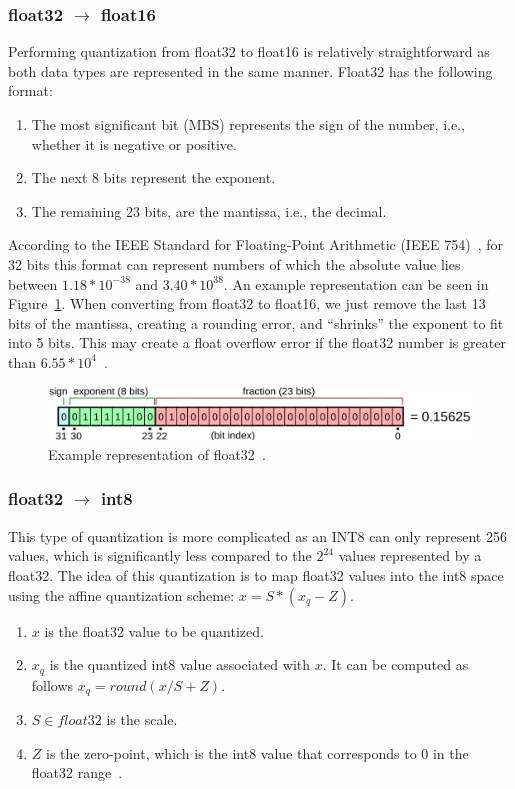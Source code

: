 \documentclass[licencjacka,en]{pracamgr}
\begin{document}
\subsubsection{float32 $\rightarrow$ float16}
Performing quantization from float32 to float16 is relatively straightforward as both data types are represented in the same manner. Float32 has the following format:
\begin{enumerate}
	\item The most significant bit (MBS) represents the sign of the number, i.e., whether it is negative or positive.
	\item The next 8 bits represent the exponent.
	\item The remaining 23 bits, are the mantissa, i.e., the decimal.
\end{enumerate}

According to the IEEE Standard for Floating-Point Arithmetic (IEEE 754)~\cite{IEEE754}, for 32 bits this format can represent numbers of which the absolute value lies between $1.18 * 10^{-38}$ and $3.40 * 10^{38}$. An example representation can be seen in Figure~\ref{fig:float}.
When converting from float32 to float16, we just remove the last 13 bits of the mantissa, creating a rounding error, and “shrinks” the exponent to fit into 5 bits. This may create a float overflow error if the float32 number is greater than $ 6.55 * 10^4$~\cite{quant_explained}.

\begin{figure}
    \centering
    \includegraphics[width=1.0\linewidth]{bachelor_images/mantis.png}
    \caption{Example representation of float32~\cite{IEEE754}.}
    \label{fig:float}
\end{figure}

\subsubsection{float32 $\rightarrow$ int8}
This type of quantization is more complicated as an INT8 can only represent 256 values, which is significantly less compared to the $ 2^{24} $  values represented by a float32. The idea of this quantization is to map float32 values into the int8 space using the affine quantization scheme: $ x = S * (x_q - Z) $.
\begin{enumerate}
	\item $ x $ is the float32 value to be quantized.
	\item  $ x_q $ is the quantized int8 value associated with $ x $. It can be computed as follows $ x_q = round(x/S + Z) $.
	\item $ S \in float32$ is the scale.
	\item $ Z $ is the zero-point, which is the int8 value that corresponds to 0 in the float32 range~\cite{quant_hf}.
\end{enumerate}
\end{document}
